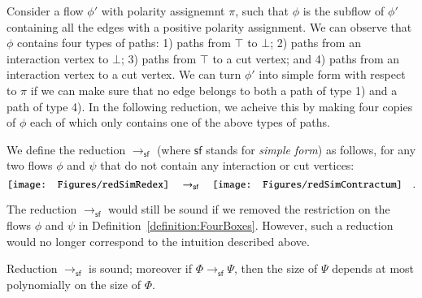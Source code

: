 Consider a flow $\phi'$ with polarity assignemnt $\pi$, such that $\phi$ is the subflow of $\phi'$ containing all the edges with a positive polarity assignment. We can observe that $\phi$ contains four types of paths: 1) paths from $\top$ to $\bot$; 2) paths from an interaction vertex to $\bot$; 3) paths from $\top$ to a cut vertex; and 4) paths from an interaction vertex to a cut vertex. We can turn $\phi'$ into simple form with respect to $\pi$ if we can make sure that no edge belongs to both a path of type 1) and a path of type 4). In the following reduction, we acheive this by making four copies of $\phi$ each of which only contains one of the above types of paths.

\newcommand{\frfb}{{\mathsf{sf}}}
\begin{definition}\label{definition:FourBoxes}
We define the reduction $\to_\frfb$ (where $\frfb$ stands for \emph{simple form}) as follows, for any two flows $\phi$ and $\psi$ that do not contain any interaction or cut vertices:
\[
\vcenter{\hbox{\texttt{[image: Figures/redSimRedex]}}}
\quad\to_\frfb\quad
\vcenter{\hbox{\texttt{[image: Figures/redSimContractum]}}}
\quad.
\]
\end{definition}

\begin{remark}\label{remark:RestrictionFourBoxes}
The reduction $\to_\frfb$ would still be sound if we removed the restriction on the flows $\phi$ and $\psi$ in Definition~\vref{definition:FourBoxes}. However, such a reduction would no longer correspond to the intuition described above.
\end{remark}

\begin{theorem}\label{theorem:SoundFourBoxes}
Reduction\/ $\to_\frfb$ is sound; moreover if $\Phi\to_\frfb\Psi$, then the size of $\Psi$ depends at most polynomially on the size of $\Phi$.
\end{theorem}

